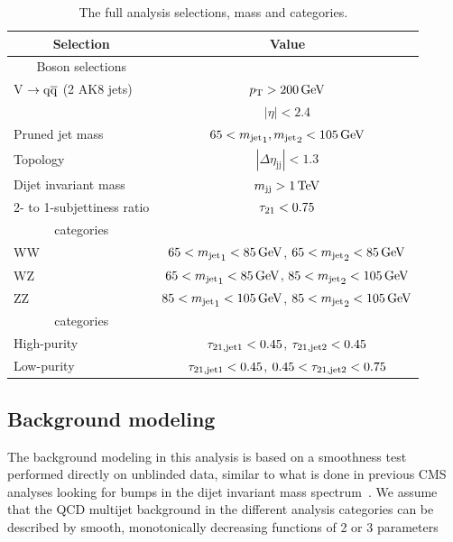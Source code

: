 \begin{table}[!htb]
\footnotesize
\begin{center}
\label{tab:search1:selection}
\renewcommand{\arraystretch}{1.2}
\begin{tabular}{lc}
\hline 
\multicolumn{1}{c}{Selection} & Value\\
\hline \hline
\multicolumn{1}{c}{Boson selections}\\
\cline{1-1}
V $\to\mathrm{q}\overline{\mathrm{q}}$ (2 AK8 jets) & $p_{\mathrm{T}} >200\,\text{Ge\hspace{-.08em}V}$\\
  & $|\eta| < 2.4$\\
Pruned jet mass & $65 < {m_{\text{jet}}}_1,{m_{\text{jet}}}_2  < 105\,\text{Ge\hspace{-.08em}V}$\\
Topology    & $|\Delta \eta_\mathrm{jj}| < 1.3$\\
Dijet invariant mass     & $m_\mathrm{jj} >1\,\text{Te\hspace{-.08em}V}$\\ 
2- to 1-subjettiness ratio    & $\tau_{21} < 0.75$\\
\hline
\multicolumn{1}{c}{\mJ{} categories}\\
\cline{1-1}
WW & $ 65 < {m_{\text{jet}}}_{1} < 85\,\text{Ge\hspace{-.08em}V}$, $ 65 < {m_{\text{jet}}}_{2} < 85\,\text{Ge\hspace{-.08em}V}$\\
WZ & $ 65 < {m_{\text{jet}}}_{1} < 85\,\text{Ge\hspace{-.08em}V}$, $ 85 < {m_{\text{jet}}}_{2} < 105\,\text{Ge\hspace{-.08em}V}$\\
ZZ & $ 85 < {m_{\text{jet}}}_{1} < 105\,\text{Ge\hspace{-.08em}V}$, $ 85 < {m_{\text{jet}}}_{2} < 105\,\text{Ge\hspace{-.08em}V}$\\
\hline
\multicolumn{1}{c}{\nsubj{} categories}\\
\cline{1-1}
High-purity   & $\tau_{\rm{21, jet1}} < 0.45$, $\tau_{\rm{21, jet2}} < 0.45$\\
Low-purity    & $\tau_{\rm{21, jet1}} < 0.45$, $0.45 < \tau_{\rm{21, jet2}} < 0.75$\\
\hline						       
\end{tabular}
\caption{The full analysis selections, mass and \nsubj categories.}
\end{center}
\end{table}


\clearpage
\subsection{Background modeling}
\label{sec:searchI:bkg}

The background modeling in this analysis is based on a smoothness test performed directly on unblinded data, similar to what is done in previous CMS analyses looking for bumps in the dijet invariant mass spectrum~\cite{Chatrchyan:2012ypy,CMS-PAS-EXO-12-059}. We assume that the QCD multijet background in the different analysis categories can be described by smooth, monotonically decreasing functions of 2 or 3 parameters

